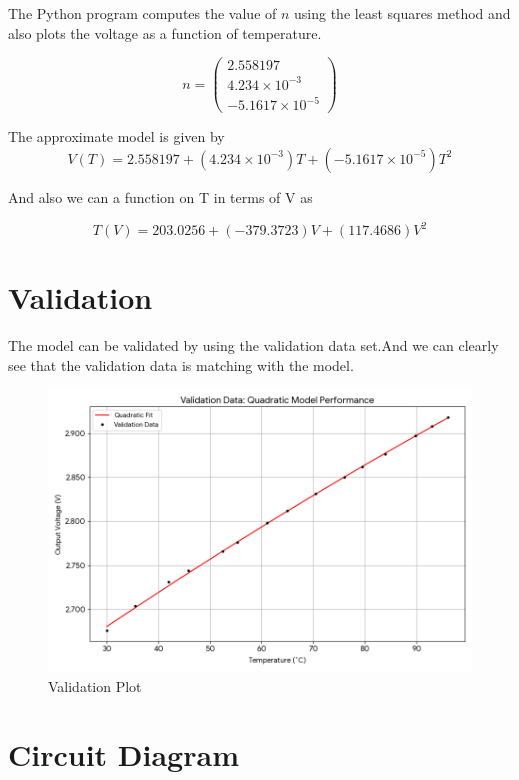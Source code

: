 \documentclass{article}
\begin{document}
The Python program  computes the value of $n$ using the least squares method and also plots the voltage as a function of temperature.

\[
n =
\begin{pmatrix}
2.558197 \\
4.234 \times 10^{-3} \\
-5.1617 \times 10^{-5}
\end{pmatrix}
\]

The approximate model is given by
\[
V(T) = 2.558197 + (4.234 \times 10^{-3})T + (-5.1617 \times 10^{-5})T^2
\]

\vspace{1 cm}
And also we can a function on T in terms of V as

\[
T(V) = 203.0256+ (-379.3723)V + (117.4686)V^2
\]


\section*{Validation}

The model can be validated by using the validation data set.And we can clearly see that the validation data is matching with the model.

\begin{figure}[H]
    \centering
    \includegraphics[width=1\textwidth]{figs/validation.png}
    \caption{Validation Plot}
    \label{fig:circuit}
\end{figure}

\section*{Circuit Diagram}
\end{document}
